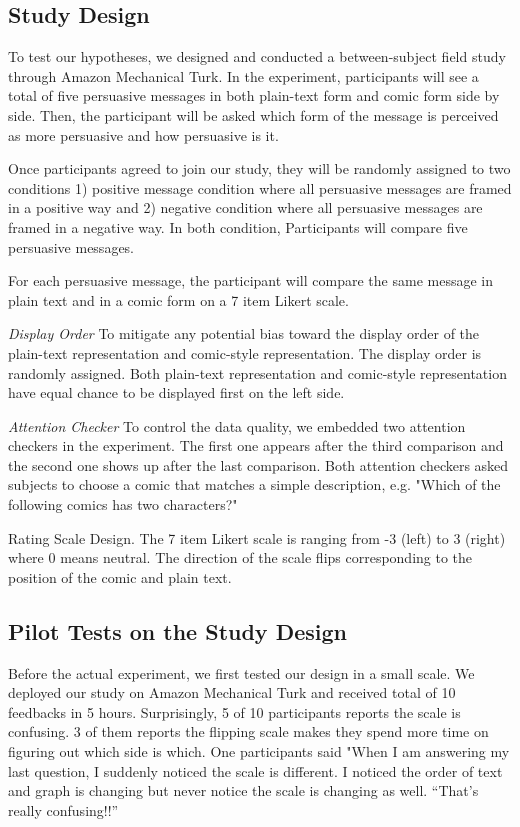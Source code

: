 \subsection{Study Design}
To test our hypotheses, we designed and conducted a between-subject field study through Amazon Mechanical Turk. In the experiment, participants will see a total of five persuasive messages in both plain-text form and comic form side by side. Then, the participant will be asked which form of the message is perceived as more persuasive and how persuasive is it.\par
Once participants agreed to join our study, they will be randomly assigned to two conditions 1) positive message condition where all persuasive messages are framed in a positive way and 2) negative condition where all persuasive messages are framed in a negative way. In both condition, Participants will compare five persuasive messages.\par
For each persuasive message, the participant will compare the same message in plain text and in a comic form on a 7 item Likert scale. \par
\textit{Display Order} To mitigate any potential bias toward the display order of the plain-text representation and comic-style representation. The display order is randomly assigned. Both plain-text representation and comic-style representation have equal chance to be displayed first on the left side.\par
\textit{Attention Checker} To control the data quality, we embedded two attention checkers in the experiment. The first one appears after the third comparison and the second one shows up after the last comparison. Both attention checkers asked subjects to choose a comic that matches a simple description, e.g. "Which of the following comics has two characters?"\par
Rating Scale Design. The 7 item Likert scale is ranging from -3 (left) to 3 (right) where 0 means neutral. The direction of the scale flips corresponding to the position of the comic and plain text. \par
\subsection{Pilot Tests on the Study Design}
Before the actual experiment, we first tested our design in a small scale. We deployed our study on Amazon Mechanical Turk and received total of 10 feedbacks in 5 hours. Surprisingly, 5 of 10 participants reports the scale is confusing. 3 of them reports the flipping scale makes they spend more time on figuring out which side is which. One participants said "When I am answering my last question, I suddenly noticed the scale is different. I noticed the order of text and graph is changing but never notice the scale is changing as well. ``That's really confusing!!''



